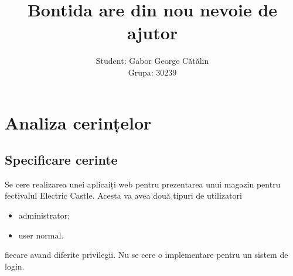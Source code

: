 \documentclass[11pt,a4paper,twoside,notitlepage]{article}
\begin{document}
\title{Bontida are din nou nevoie de ajutor}

\author{
Student: Gabor George C\u{a}t\u{a}lin\\ %
Grupa: 30239\\
}

\maketitle 

\newpage

\tableofcontents



\newpage

\section{Analiza cerințelor}

\subsection{Specificare cerinte}
Se cere realizarea unei aplicaiți web pentru prezentarea unui magazin pentru fectivalul Electric Castle. Acesta va avea două tipuri de utilizatori 
\begin{itemize}
	\item administrator;
	\item user normal.
\end{itemize}
fiecare avand diferite privilegii. Nu se cere o implementare pentru un sistem de login.
\end{document}
